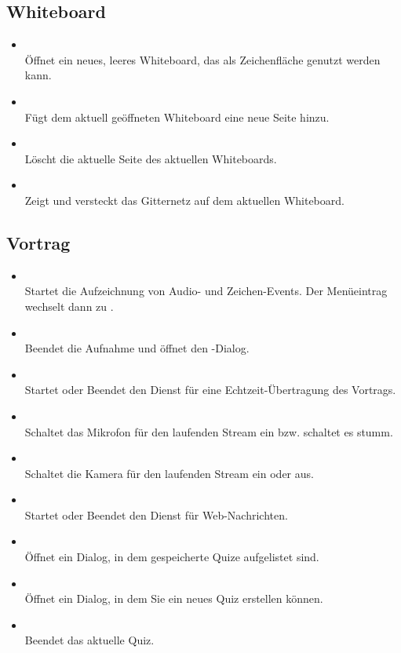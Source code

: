 \subsection{Whiteboard}
\begin{itemize}
\item {}\\Öffnet ein neues, leeres Whiteboard, das als Zeichenfläche genutzt werden kann.
\item {}\\Fügt dem aktuell geöffneten Whiteboard eine neue Seite hinzu.
\item {}\\Löscht die aktuelle Seite des aktuellen Whiteboards.
\item {}\\Zeigt und versteckt das Gitternetz auf dem aktuellen Whiteboard.
\end{itemize}
\subsection{Vortrag}
\begin{itemize}
\item {}\\Startet die Aufzeichnung von Audio- und Zeichen-Events. Der Menüeintrag wechselt dann zu .
\item {}\\Beendet die Aufnahme und öffnet den -Dialog.
\item {}\\ Startet oder Beendet den Dienst für eine Echtzeit-Übertragung des Vortrags.
\item {}\\ Schaltet das Mikrofon für den laufenden Stream ein bzw. schaltet es stumm.
\item {}\\ Schaltet die Kamera für den laufenden Stream ein oder aus.
\item {}\\ Startet oder Beendet den Dienst für Web-Nachrichten.
\item {}\\ Öffnet ein Dialog, in dem gespeicherte Quize aufgelistet sind.
\item {}\\ Öffnet ein Dialog, in dem Sie ein neues Quiz erstellen können.
\item {}\\ Beendet das aktuelle Quiz.
\end{itemize}
\vfill

